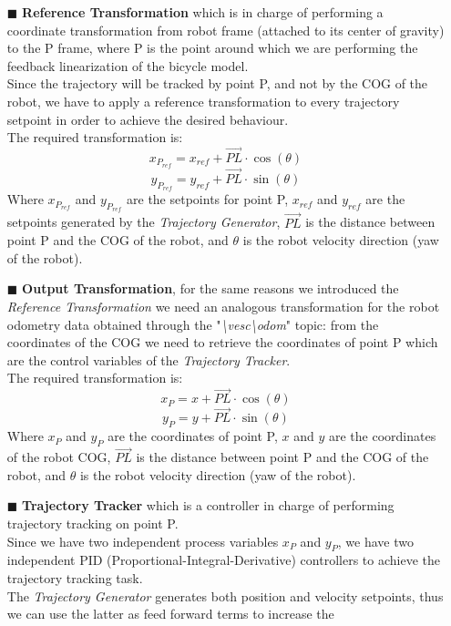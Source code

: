 \begin{itemize}
\begin{itemize}
		\end{itemize}
	\item[\textcolor{BlueGreen}{$\blacksquare$}] \textbf{Reference Transformation} which is in charge of performing a coordinate
		transformation from robot frame (attached to its center of gravity) to the P frame, where P is the point around which we
		are performing the feedback linearization of the bicycle model. \\
		Since the trajectory will be tracked by point P, and not by the COG of the robot, we have to apply a reference transformation
		to every trajectory setpoint in order to achieve the desired behaviour. \\
		The required transformation is:
			\[ x_{P_{ref}} = x_{ref} + \overrightarrow{PL} \cdot \cos(\theta) \]
			\[ y_{P_{ref}} = y_{ref} + \overrightarrow{PL} \cdot \sin(\theta) \]
		Where $x_{P_{ref}}$ and $y_{P_{ref}}$ are the setpoints for point P, $x_{ref}$ and $y_{ref}$ are the setpoints generated by
		the \textit{Trajectory Generator}, $\overrightarrow{PL}$ is the distance between point P and the COG of the robot, and $\theta$
		is the robot velocity direction (yaw of the robot).
	\item[\textcolor{BlueGreen}{$\blacksquare$}] \textbf{Output Transformation}, for the same reasons we introduced the \textit{Reference Transformation}
		we need an analogous transformation for the robot odometry data obtained through the "\textit{\textbackslash{}vesc\textbackslash{}odom}" topic:
		from the coordinates of the COG we need to retrieve the coordinates of point P which are the control variables of the \textit{Trajectory Tracker}. \\
		The required transformation is:
			\[ x_{P} = x + \overrightarrow{PL} \cdot \cos(\theta) \]
			\[ y_{P} = y + \overrightarrow{PL} \cdot \sin(\theta) \]
		Where $x_{P}$ and $y_{P}$ are the coordinates of point P, $x$ and $y$ are the coordinates of the robot COG, $\overrightarrow{PL}$ is the distance 
		between point P and the COG of the robot, and $\theta$ is the robot velocity direction (yaw of the robot).
	\item[\textcolor{BlueGreen}{$\blacksquare$}] \textbf{Trajectory Tracker} which is a controller in charge of performing trajectory tracking on 
		point P. \\
		Since we have two independent process variables $x_{P}$ and $y_{P}$, we have two independent PID (Proportional-Integral-Derivative) controllers to 
		achieve the trajectory tracking task. \\
		The \textit{Trajectory Generator} generates both position and velocity setpoints, thus we can use the latter as feed forward terms to increase the

\end{itemize}
